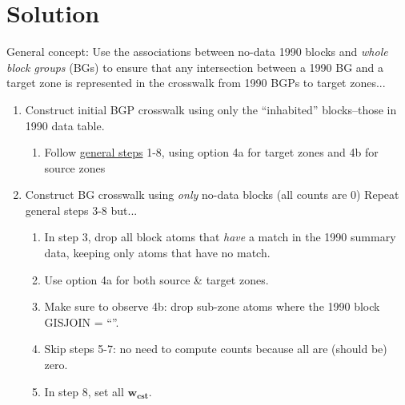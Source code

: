 \documentclass{article}
\begin{document}
\section{Solution}

General concept: Use the associations between no-data 1990 blocks and \textit{whole block groups} (BGs) to ensure that any intersection between a 1990 BG and a target zone is represented in the crosswalk from 1990 BGPs to target zones...

\begin{enumerate}

\item Construct initial BGP crosswalk using only the ``inhabited'' blocks--those in 1990 data table.
    \begin{enumerate}
    \item Follow \href{https://github.com/jGaboardi/nhgisxwalk/blob/master/resources/general-crosswalk-construction-framework.pdf}{general steps} 1-8, using option 4a for target zones and 4b for source zones
    \end{enumerate}

\item Construct BG crosswalk using \textit{only} no-data blocks (all counts are 0)
Repeat general steps 3-8 but...
    \begin{enumerate}
    \item In step 3, drop all block atoms that \textit{have} a match in the 1990 summary data, keeping only atoms that have no match.
    \item Use option 4a for both source \& target zones.
    \item Make sure to observe 4b: drop sub-zone atoms where the 1990 block GISJOIN = ``''.
    \item Skip steps 5-7: no need to compute counts because all are (should be) zero.
    \item In step 8, set all $\bm{w_{\mathbf{cst}}}$.
    \end{enumerate}
    

\end{enumerate}
\end{document}
